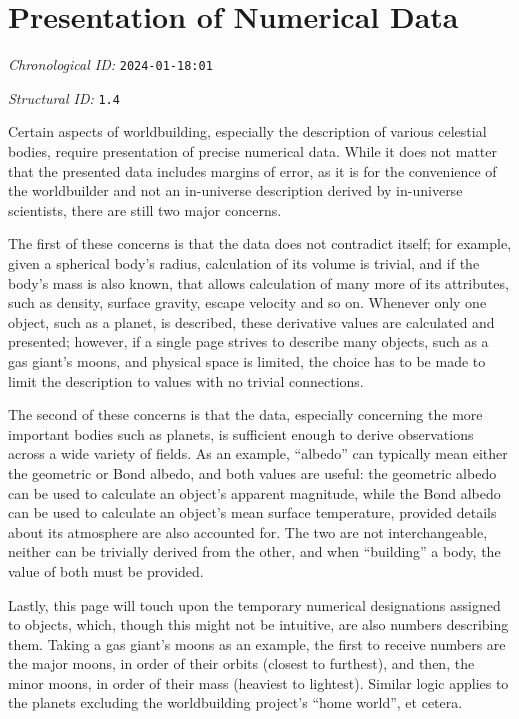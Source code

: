 \section{Presentation of Numerical Data}
\emph{Chronological ID:} \texttt{2024-01-18:01}

\emph{Structural ID:} \texttt{1.4}

Certain aspects of worldbuilding, especially the description of various celestial bodies, require presentation of precise numerical data. While it does not matter that the presented data includes margins of error, as it is for the convenience of the worldbuilder and not an in-universe description derived by in-universe scientists, there are still two major concerns.

The first of these concerns is that the data does not contradict itself; for example, given a spherical body's radius, calculation of its volume is trivial, and if the body's mass is also known, that allows calculation of many more of its attributes, such as density, surface gravity, escape velocity and so on. Whenever only one object, such as a planet, is described, these derivative values are calculated and presented; however, if a single page strives to describe many objects, such as a gas giant's moons, and physical space is limited, the choice has to be made to limit the description to values with no trivial connections.

The second of these concerns is that the data, especially concerning the more important bodies such as planets, is sufficient enough to derive observations across a wide variety of fields. As an example, ``albedo'' can typically mean either the geometric or Bond albedo, and both values are useful: the geometric albedo can be used to calculate an object's apparent magnitude, while the Bond albedo can be used to calculate an object's mean surface temperature, provided details about its atmosphere are also accounted for. The two are not interchangeable, neither can be trivially derived from the other, and when ``building'' a body, the value of both must be provided.

Lastly, this page will touch upon the temporary numerical designations assigned to objects, which, though this might not be intuitive, are also numbers describing them. Taking a gas giant's moons as an example, the first to receive numbers are the major moons, in order of their orbits (closest to furthest), and then, the minor moons, in order of their mass (heaviest to lightest). Similar logic applies to the planets excluding the worldbuilding project's ``home world'', et cetera.
\newpage
